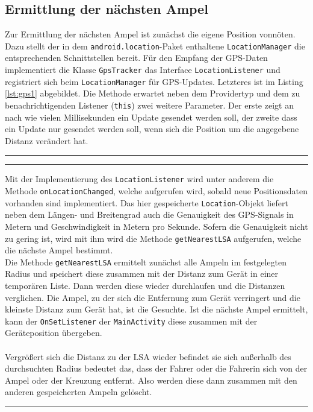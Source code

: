 \subsection{Ermittlung der nächsten Ampel}
Zur Ermittlung der nächsten Ampel ist zunächst die eigene Position vonnöten. Dazu stellt der in dem \texttt{android.location}-Paket enthaltene \texttt{LocationManager} die entsprechenden Schnittstellen bereit. Für den Empfang der \gls{GPS}-Daten implementiert die Klasse \texttt{GpsTracker} das Interface \texttt{LocationListener} und registriert sich beim \texttt{LocationManager} für \gls{GPS}-Updates.
Letzteres ist im Listing \ref{lst:gps1} abgebildet. Die Methode erwartet neben dem Providertyp und dem zu benachrichtigenden Listener (\texttt{this}) zwei weitere Parameter. Der erste zeigt an nach wie vielen Millisekunden ein Update gesendet werden soll, der zweite dass ein Update nur gesendet werden soll, wenn sich die Position um die angegebene Distanz verändert hat.
\begin{center}
\rule{35em}{0.5pt}

\rule{35em}{0.5pt}
\end{center}
Mit der Implementierung des \texttt{LocationListener} wird unter anderem die Methode \texttt{onLocationChanged}, welche aufgerufen wird, sobald neue Positionsdaten vorhanden sind implementiert. Das hier gespeicherte \texttt{Location}-Objekt liefert neben dem Längen- und Breitengrad auch die Genauigkeit des \gls{GPS}-Signals in Metern und Geschwindigkeit in Metern pro Sekunde. Sofern die Genauigkeit nicht zu gering ist, wird mit ihm wird die Methode \texttt{getNearestLSA} aufgerufen, welche die nächste Ampel bestimmt.\\
Die Methode \texttt{getNearestLSA} ermittelt zunächst alle Ampeln im festgelegten Radius und speichert diese zusammen mit der Distanz zum Gerät in einer temporären Liste. Dann werden diese wieder durchlaufen und die Distanzen verglichen. Die Ampel, zu der sich die Entfernung zum Gerät verringert und die kleinste Distanz zum Gerät hat, ist die Gesuchte. Ist die nächste Ampel ermittelt, kann der \texttt{OnSetListener} der \texttt{MainActivity} diese zusammen mit der Geräteposition übergeben. \\\\
Vergrößert sich die Distanz zu der \gls{LSA} wieder befindet sie sich außerhalb des durchsuchten Radius bedeutet das, dass der Fahrer oder die Fahrerin sich von der Ampel oder der Kreuzung entfernt. Also werden diese dann zusammen mit den anderen gespeicherten Ampeln gelöscht. 
\clearpage
\begin{center}

\rule{35em}{0.5pt}
\end{center}
%
%
